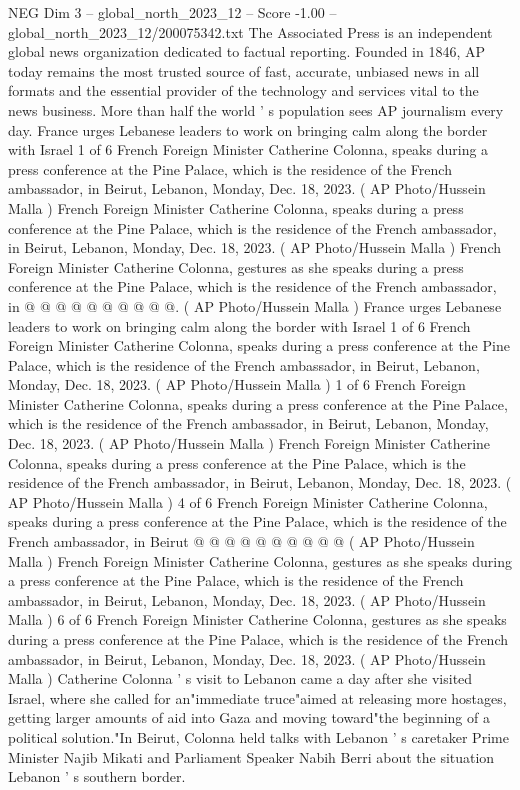 \begin{textsample}{NEG Dim 3 – global\_north\_2023\_12 – Score -1.00 – global\_north\_2023\_12/200075342.txt}  \label{ex:f3_neg_191}
The Associated Press is an independent global news organization dedicated to factual reporting.
Founded in 1846, AP today remains the most trusted source of fast, accurate, unbiased news in all formats and the essential provider of the technology and services vital to the news business.
More than half the world ' s population sees AP journalism every day.
France urges Lebanese leaders to work on bringing calm along the border with Israel 1 of 6 French Foreign Minister Catherine Colonna, speaks during a press conference at the Pine Palace, which is the residence of the French ambassador, in Beirut, Lebanon, Monday, Dec. 18, 2023. ( AP Photo/Hussein Malla ) French Foreign Minister Catherine Colonna, speaks during a press conference at the Pine Palace, which is the residence of the French ambassador, in Beirut, Lebanon, Monday, Dec. 18, 2023. ( AP Photo/Hussein Malla ) French Foreign Minister Catherine Colonna, gestures as she speaks during a press conference at the Pine Palace, which is the residence of the French ambassador, in @ @ @ @ @ @ @ @ @ @. ( AP Photo/Hussein Malla ) France urges Lebanese leaders to work on bringing calm along the border with Israel 1 of 6 French Foreign Minister Catherine Colonna, speaks during a press conference at the Pine Palace, which is the residence of the French ambassador, in Beirut, Lebanon, Monday, Dec. 18, 2023. ( AP Photo/Hussein Malla ) 1 of 6 French Foreign Minister Catherine Colonna, speaks during a press conference at the Pine Palace, which is the residence of the French ambassador, in Beirut, Lebanon, Monday, Dec. 18, 2023. ( AP Photo/Hussein Malla ) French Foreign Minister Catherine Colonna, speaks during a press conference at the Pine Palace, which is the residence of the French ambassador, in Beirut, Lebanon, Monday, Dec. 18, 2023. ( AP Photo/Hussein Malla ) 4 of 6 French Foreign Minister Catherine Colonna, speaks during a press conference at the Pine Palace, which is the residence of the French ambassador, in Beirut @ @ @ @ @ @ @ @ @ @ ( AP Photo/Hussein Malla ) French Foreign Minister Catherine Colonna, gestures as she speaks during a press conference at the Pine Palace, which is the residence of the French ambassador, in Beirut, Lebanon, Monday, Dec. 18, 2023. ( AP Photo/Hussein Malla ) 6 of 6 French Foreign Minister Catherine Colonna, gestures as she speaks during a press conference at the Pine Palace, which is the residence of the French ambassador, in Beirut, Lebanon, Monday, Dec. 18, 2023. ( AP Photo/Hussein Malla ) Catherine Colonna ' s visit to Lebanon came a day after she visited Israel, where she called for an"immediate truce"aimed at releasing more hostages, getting larger amounts of aid into Gaza and moving toward"the beginning of a political solution."In Beirut, Colonna held talks with Lebanon ' s caretaker Prime Minister Najib Mikati and Parliament Speaker Nabih Berri about the situation Lebanon ' s southern border.

\end{textsample}
